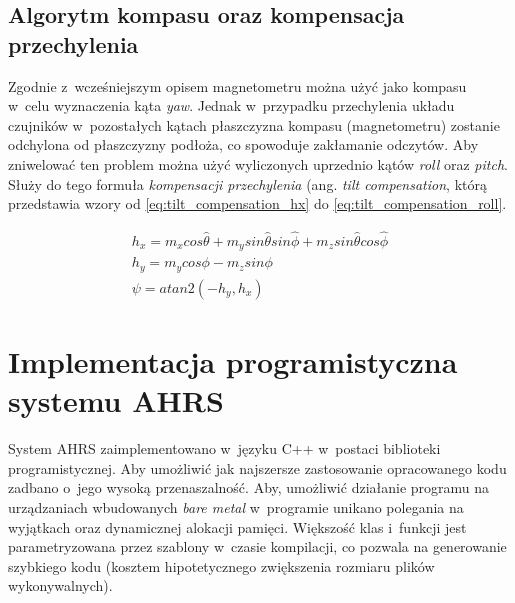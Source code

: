 \subsection{Algorytm kompasu oraz kompensacja przechylenia}
Zgodnie z~wcześniejszym opisem magnetometru można użyć jako kompasu w~celu
wyznaczenia kąta \textit{yaw}.
Jednak w~przypadku przechylenia układu czujników w~pozostałych kątach
płaszczyzna kompasu (magnetometru) zostanie odchylona od płaszczyzny podłoża,
co spowoduje zakłamanie odczytów.
Aby zniwelować ten problem można użyć wyliczonych uprzednio kątów \textit{roll}
oraz \textit{pitch}.
Służy do tego formuła \textit{kompensacji przechylenia} (ang. \textit{tilt
compensation}, którą przedstawia wzory od \ref{eq:tilt_compensation_hx} do
\ref{eq:tilt_compensation_roll}.

\begin{gather}
	h_x = m_x cos\hat{\theta} + 
	      m_y sin\hat{\theta} sin\hat{\phi} +
          m_z sin\hat{\theta} cos\hat{\phi}
\label{eq:tilt_compensation_hx} \\
    h_y = m_y cos\phi - m_z sin\phi
\label{eq:tilt_compensation_hy} \\
    \psi = atan2(-h_y, h_x)
\label{eq:tilt_compensation_roll}
\end{gather}

\section{Implementacja programistyczna systemu AHRS}
System AHRS zaimplementowano w~języku C++ w~postaci biblioteki
programistycznej.
Aby umożliwić jak najszersze zastosowanie opracowanego kodu zadbano o~jego
wysoką przenaszalność.
Aby, umożliwić działanie programu na urządzaniach wbudowanych \textit{bare
metal} w~programie unikano polegania na wyjątkach oraz dynamicznej alokacji
pamięci.
Większość klas i~funkcji jest parametryzowana przez szablony w~czasie
kompilacji, co pozwala na generowanie szybkiego kodu (kosztem
hipotetycznego zwiększenia rozmiaru plików wykonywalnych).
